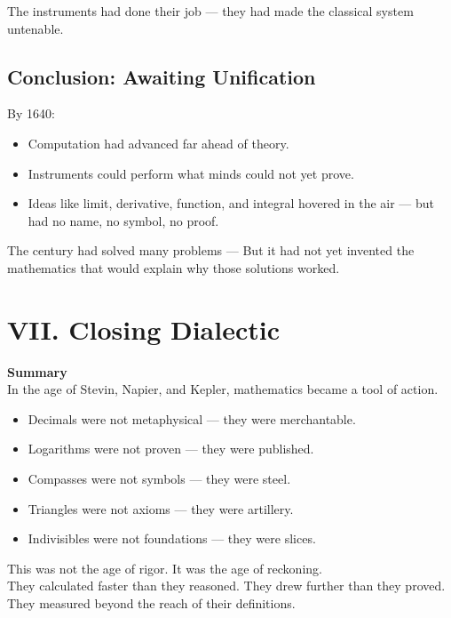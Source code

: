 \documentclass[9pt]{article}
\begin{document}
The instruments had done their job — they had made the classical system untenable.

\subsection*{Conclusion: Awaiting Unification}

By 1640:

\begin{itemize}
    \item Computation had advanced far ahead of theory.
    \item Instruments could perform what minds could not yet prove.
    \item Ideas like limit, derivative, function, and integral hovered in the air — but had no name, no symbol, no proof.
\end{itemize}

The century had solved many problems —  
But it had not yet invented the mathematics that would explain why those solutions worked.





\newpage

\section*{VII. Closing Dialectic}

\textbf{Summary}\\

In the age of Stevin, Napier, and Kepler, mathematics became a tool of action.\\

\begin{itemize}
    \item Decimals were not metaphysical — they were merchantable.
    \item Logarithms were not proven — they were published.
    \item Compasses were not symbols — they were steel.
    \item Triangles were not axioms — they were artillery.
    \item Indivisibles were not foundations — they were slices.
\end{itemize}

This was not the age of rigor.  
It was the age of reckoning.\\

They calculated faster than they reasoned.  
They drew further than they proved.  
They measured beyond the reach of their definitions.\\
\end{document}
